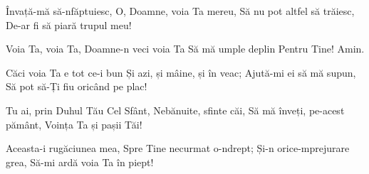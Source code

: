 \beginverse
Învață-mă să-nfăptuiesc,
O, Doamne, voia Ta mereu,
Să nu pot altfel să trăiesc,
De-ar fi să piară trupul meu!
\endverse

\beginchorus
Voia Ta, voia Ta,
Doamne-n veci voia Ta
Să mă umple deplin
Pentru Tine! Amin.
\endchorus

\beginverse
Căci voia Ta e tot ce-i bun
Și azi, și mâine, și în veac;
Ajută-mi ei să mă supun,
Să pot să-Ți fiu oricând pe plac!
\endverse

\beginverse
Tu ai, prin Duhul Tău Cel Sfânt,
Nebănuite, sfinte căi,
Să mă înveți, pe-acest pământ,
Voința Ta și pașii Tăi!
\endverse

\beginverse
Aceasta-i rugăciunea mea,
Spre Tine necurmat o-ndrept;
Și-n orice-mprejurare grea,
Să-mi ardă voia Ta în piept!
\endverse
\endsong
